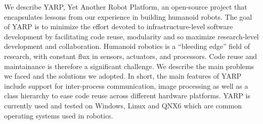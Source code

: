 
We describe YARP, Yet Another Robot Platform, an open-source project
that encapsulates lessons from our experience in building humanoid
robots.  The goal of YARP is to minimize the effort
devoted to infrastructure-level software development
 by facilitating code reuse, 
modularity and so maximize research-level development and collaboration. Humanoid robotics is a ``bleeding edge'' field of research, with constant flux in sensors, actuators, and 
processors.  Code reuse and maintainance is therefore a significant 
challenge. We describe the main problems we faced and the 
solutions we adopted. 
In short, the main features of YARP include support for inter-process
communication, image processing as well as a class hierarchy
to ease code reuse across different hardware platforms. YARP
is currently used and tested on Windows, Linux and QNX6 which are common 
operating systems used in robotics. 

